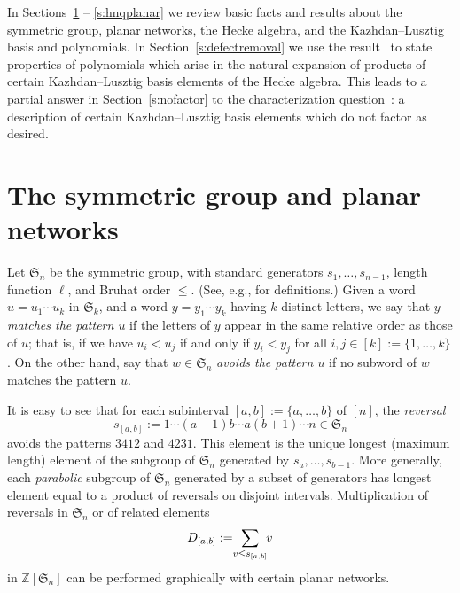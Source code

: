 \documentclass[12pt]{amsart}
\theoremstyle{definition}
\numberwithin{equation}{section}
\newcommand{\sn}{\mathfrak{S}_n}
\newcommand{\mfs}[1]{\mathfrak{S}_{#1}}
\newcommand{\zsn}{\mathbb{Z}[\sn]}
\newcommand{\defeq}{:=}
\newcommand{\avoidsp}{avoids the patterns $3412$ and $4231${}}
\newcommand{\ntksp}{\negthickspace}
\begin{document}
In Sections~\ref{s:snplanar} -- \ref{s:hnqplanar} we review basic facts and results about
the symmetric group, planar networks, the Hecke algebra, and the Kazhdan--Lusztig basis and polynomials.
In Section~\ref{s:defectremoval} we use the result~\cite[Cor.\,5.3]{CSkanTNNChar} to state properties of polynomials which arise in the natural expansion of products of certain Kazhdan--Lusztig basis elements of the Hecke algebra. This leads to a partial answer in Section~\ref{s:nofactor} to the characterization question~\cite[Quest.\,4.5]{SkanNNDCB}: a description of 
certain Kazhdan--Lusztig basis elements which do not factor as desired. 


\section{The symmetric group and planar networks}\label{s:snplanar}

Let $\sn$ be the symmetric group, with standard generators
$s_1,\dotsc,s_{n-1}$, length function $\ell$, and Bruhat order $\leq$.
(See, e.g., \cite{BBCoxeter} for definitions.)
Given a word $u = u_1 \cdots u_k$ in $\mfs k$,
and a word $y = y_1 \cdots y_k$ having $k$ distinct letters,
we say that {\em $y$ matches the pattern $u$} if the letters of $y$ appear
in the same relative order as those of $u$; that is, if we have
$u_i < u_j$ if and only if $y_i < y_j$ for all $i,j \in [k] \defeq \{1,\dotsc,k\}$.
On the other hand, 
say that $w \in \mfs n$ 
{\em avoids the pattern $u$} if no subword
of $w$ matches the pattern $u$.

It is easy to see that for 
each subinterval $[a,b] \defeq \{a,\dotsc,b\}$ of $[n]$,
the 
{\em reversal} 
\begin{equation}\label{eq:reversaldef} s_{[a,b]} \defeq 1 \cdots (a-1) b \cdots a (b+1) \cdots n \in \sn
\end{equation}
\avoidsp.
This element
is the unique longest (maximum length) element of the subgroup of $\sn$ generated by $s_a, \dotsc, s_{b-1}$.
More generally, each {\em parabolic} subgroup of $\sn$ generated by a subset 
of generators 
has longest element equal to a product of reversals on disjoint intervals.
Multiplication of reversals in $\sn$ or of related elements
\begin{equation}\label{eq:Dab}
D_{[a,b]} \defeq \ntksp 
\sum_{v \leq s_{[a,b]}}\ntksp  v
\end{equation}
in $\zsn$ can be performed graphically with certain planar networks.
\end{document}
